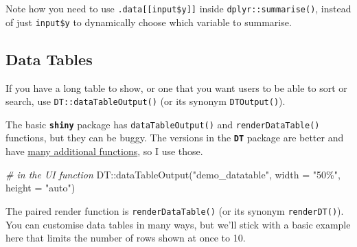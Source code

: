 \documentclass[
  oneside]{book}
\newenvironment{Shaded}{\begin{snugshade}}{\end{snugshade}}
\newcommand{\AttributeTok}[1]{\textcolor[rgb]{0.77,0.63,0.00}{#1}}
\newcommand{\CommentTok}[1]{\textcolor[rgb]{0.56,0.35,0.01}{\textit{#1}}}
\newcommand{\DecValTok}[1]{\textcolor[rgb]{0.00,0.00,0.81}{#1}}
\newcommand{\FunctionTok}[1]{\textcolor[rgb]{0.00,0.00,0.00}{#1}}
\newcommand{\NormalTok}[1]{#1}
\newcommand{\OtherTok}[1]{\textcolor[rgb]{0.56,0.35,0.01}{#1}}
\newcommand{\SpecialCharTok}[1]{\textcolor[rgb]{0.00,0.00,0.00}{#1}}
\newcommand{\StringTok}[1]{\textcolor[rgb]{0.31,0.60,0.02}{#1}}
\begin{document}
\begin{warning}
Note how you need to use \texttt{.data{[}{[}input\$y{]}{]}} inside \texttt{dplyr::summarise}\texttt{()}, instead of just \texttt{input\$y} to dynamically choose which variable to summarise.

\end{warning}

\hypertarget{data-tables}{%
\subsection{Data Tables}\label{data-tables}}

If you have a long table to show, or one that you want users to be able to sort or search, use \texttt{DT::dataTableOutput}\texttt{()} (or its synonym \texttt{DTOutput}\texttt{()}).

The basic \textbf{\texttt{shiny}} package has \texttt{dataTableOutput}\texttt{()} and \texttt{renderDataTable}\texttt{()} functions, but they can be buggy. The versions in the \textbf{\texttt{DT}} package are better and have \href{https://rstudio.github.io/DT/}{many additional functions}, so I use those.

\begin{Shaded}
\begin{Highlighting}[]
\CommentTok{\# in the UI function}
\NormalTok{DT}\SpecialCharTok{::}\FunctionTok{dataTableOutput}\NormalTok{(}\StringTok{"demo\_datatable"}\NormalTok{, }\AttributeTok{width =} \StringTok{"50\%"}\NormalTok{, }\AttributeTok{height =} \StringTok{"auto"}\NormalTok{)}
\end{Highlighting}
\end{Shaded}

The paired render function is \texttt{renderDataTable}\texttt{()} (or its synonym \texttt{renderDT}\texttt{()}). You can customise data tables in many ways, but we'll stick with a basic example here that limits the number of rows shown at once to \DecValTok{10}.

\begin{Shaded}
\end{Shaded}
\end{document}
